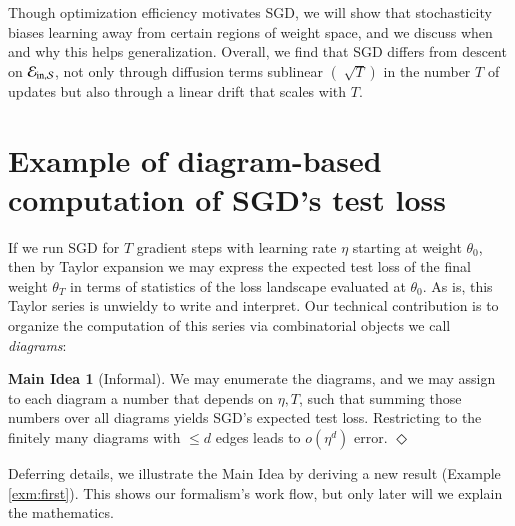 \documentclass[openany, notitlepage, justified]{tufte-book}
\theoremstyle{plain}
\theoremstyle{definition}
\newtheorem*{midea*}{Main Idea}
\newcommand{\wasq}[1]{\left[#1\right]}
\newcommand{\expc}{\mathbb{E}}
\newcommand{\mend}{\hfill $\Diamond$}
\begin{document}
            Though optimization efficiency motivates SGD, we will show that
            stochasticity biases learning away from certain regions of weight
            space, and we discuss when and why this helps generalization.
            Overall, we find that SGD differs from descent on $\mathcal{E}_{\text{in},\mathcal{S}}$, not only
            through diffusion terms sublinear $(\sqrt[]{T})$ in the number $T$
            of updates but also through a linear drift that scales with $T$.

    \section{Example of diagram-based computation of SGD's test loss} \label{subsect:example}

        \newcommand{\nb} { \nabla }
        \newcommand{\lx} { l_x(\theta) }
        \newcommand{\teq} { \triangleq }
        \newcommand{\ex}[1] { \expc_x \wasq{#1} }

        If we run SGD for $T$ gradient steps with learning rate $\eta$ starting
        at weight $\theta_0$, then by Taylor expansion we may express the
        expected test loss of the final weight $\theta_T$ in terms of
        statistics of the loss landscape evaluated at $\theta_0$.
        As is, this Taylor series is unwieldy to write and interpret.
        Our technical contribution is to organize the computation of this
        series via combinatorial objects we call
        \emph{diagrams}:
        \begin{midea*}[Informal]
            We may enumerate the diagrams, and we may assign to
            each diagram a number that depends on $\eta, T$, such that
            summing those numbers over all diagrams yields SGD's expected test
            loss.  Restricting to the finitely many diagrams with $\leq d$
            edges leads to $o(\eta^d)$ error.
            \mend
        \end{midea*}

        Deferring details, we illustrate the Main Idea by deriving a new result
        (Example \ref{exm:first}).  This shows our formalism's work flow,
        but only later will we explain the mathematics.
\end{document}
